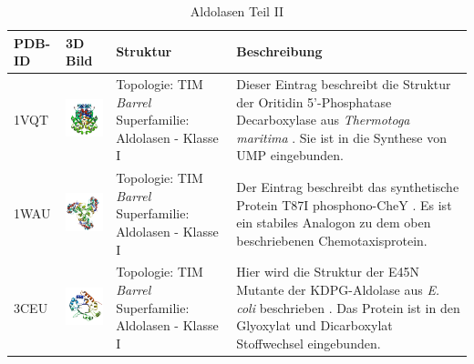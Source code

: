 \documentclass{article}
\begin{document}
\begin{table}
\begin{center}
\caption{Aldolasen Teil II}
\begin{tabular}{ | C{9mm} | C{30mm} | C{29mm} | C{38mm} | }
\hline
PDB-ID & 3D Bild & Struktur & Beschreibung \\ \hline
1VQT  & \includegraphics[width=30mm, trim= -10 -5 -5 -10]{1VQT_bio_r_500.jpg} & Topologie: \newline TIM \textit{Barrel} \newline Superfamilie: Aldolasen - Klasse I & Dieser Eintrag beschreibt die Struktur der Oritidin 5'-Phosphatase Decarboxylase aus \textit{Thermotoga maritima} \cite{1vqt}. Sie ist in die Synthese von UMP eingebunden. \\ \hline
1WAU  & \includegraphics[width=30mm, trim= -10 -5 -5 -10]{1WAU_bio_r_500.jpg} &Topologie: \newline TIM \textit{Barrel} \newline Superfamilie: Aldolasen - Klasse I  & Der Eintrag beschreibt das synthetische Protein T87I phosphono-CheY \cite{2id9}. Es ist ein stabiles Analogon zu dem oben beschriebenen Chemotaxisprotein. \\ \hline
3CEU  & \includegraphics[width=30mm, trim= -10 -5 -5 -10]{3CEU_bio_r_500.jpg}  & Topologie: \newline TIM \textit{Barrel} \newline Superfamilie: Aldolasen - Klasse I & Hier wird die Struktur der E45N Mutante der KDPG-Aldolase aus \textit{E. coli} beschrieben \cite{3ceu}. Das Protein ist in den Glyoxylat und Dicarboxylat Stoffwechsel eingebunden. \\ \hline

\end{tabular}
\end{center}
\end{table}
\end{document}
